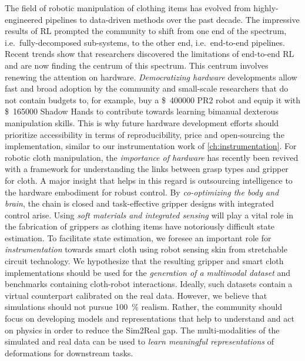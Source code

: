 \documentclass[\home/main.tex]{subfiles}
\begin{document}
The field of robotic manipulation of clothing items has evolved from highly-engineered pipelines to data-driven methods over the past decade. The impressive results of \gls{RL} prompted the community to shift from one end of the spectrum, i.e.\ fully-decomposed sub-systems, to the other end, i.e.\ end-to-end pipelines. Recent trends show that researchers discovered the limitations of end-to-end \gls{RL} and are now finding the centrum of this spectrum. 
This centrum involves renewing the attention on hardware.
\emph{Democratizing hardware} developments allow fast and broad adoption by the community and small-scale researchers that do not contain budgets to, for example, buy a \SI{400000}[\$]{} PR2 robot and equip it with \SI{165000}[\$]{} Shadow Hands to contribute towards learning bimanual dexterous manipulation skills. 
This is why future hardware development efforts should prioritize accessibility in terms of reproducibility, price and open-sourcing the implementation, similar to our instrumentation work of \cref{ch:instrumentation}. 
For robotic cloth manipulation, the \emph{importance of hardware} has recently been revived with a framework for understanding the links between grasp types and gripper for cloth.
A major insight that helps in this regard is outsourcing intelligence to the hardware embodiment for robust control. By \emph{co-optimizing the body and brain}, the chain is closed and task-effective gripper designs with integrated control arise. 
Using \emph{soft materials and integrated sensing} will play a vital role in the fabrication of grippers as clothing items have notoriously difficult state estimation.
To facilitate state estimation, we foresee an important role for \emph{instrumentation} towards smart cloth using robot sensing skin from stretchable circuit technology. 
We hypothesize that the resulting gripper and smart cloth implementations should be used for the \emph{generation of a multimodal dataset} and benchmarks containing cloth-robot interactions. Ideally, such datasets contain a virtual counterpart calibrated on the real data. However, we believe that simulations should not pursue \qty{100}{\percent} realism. Rather, the community should focus on developing models and representations that help to understand and act on physics in order to reduce the Sim2Real gap. 
The multi-modalities of the simulated and real data can be used to \emph{learn meaningful representations} of deformations for downstream tasks.
\end{document}
